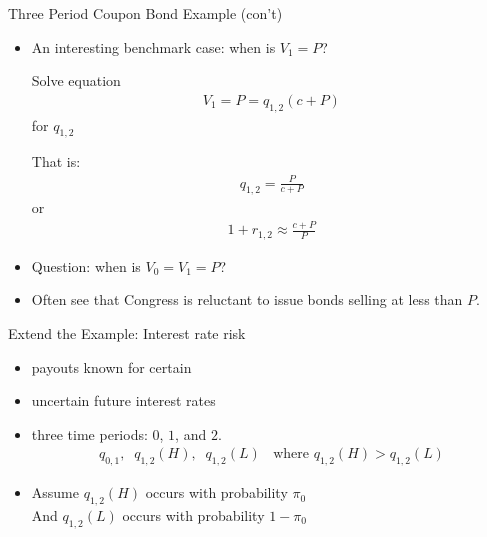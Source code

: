 \documentclass[professionalfonts,small]{beamer}
\begin{document}
\begin{frame}{Three Period Coupon Bond Example (con't)}

\footnotesize

\begin{itemize}

\item An interesting benchmark case: when is $V_1 = P$?

Solve equation
\begin{eqnarray*}
V_1 = P = q_{1,2}(c+P)
\end{eqnarray*}
for $q_{1,2}$

That is:
\begin{eqnarray*}
q_{1,2} = \frac{P}{c+P}
\end{eqnarray*}
or
\begin{eqnarray*}
1+r_{1,2} \approx \frac{c+P}{P}
\end{eqnarray*}

\item Question:  when is $V_0 = V_1 = P$?

\item Often see that Congress is reluctant to issue bonds selling at less than $P$.

\end{itemize}

\end{frame}

\begin{frame}{Extend the Example: Interest rate risk}

\begin{itemize}

\item payouts known for certain

\medskip

\item uncertain future interest rates

\medskip

\item three time periods: $0$, $1$, and $2$.
\begin{eqnarray*}
q_{0,1}, \; \; q_{1,2}(H), \; \; q_{1,2}(L) \; \; \mbox{ where $q_{1,2}(H) > q_{1,2}(L)$}
\end{eqnarray*}

\medskip


\item Assume $q_{1,2}(H)$ occurs with probability $\pi_0$\\
And $q_{1,2}(L)$ occurs with probability $1-\pi_0$

\end{itemize}

\end{frame}
\end{document}
